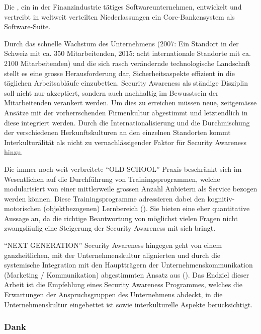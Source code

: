 \documentclass[../../main.tex]{subfiles}
\begin{document}
\begin{sloppypar}
Die \company, ein in der Finanzindustrie tätiges Softwareunternehmen, entwickelt und vertreibt in weltweit verteilten Niederlassungen ein Core-Bankensystem als Software-Suite.

Durch das schnelle Wachstum des Unternehmens (2007: Ein Standort in der Schweiz mit ca. 350 Mitarbeitenden, 2015: acht internationale Standorte mit ca. 2100 Mitarbeitenden) und die sich rasch verändernde technologische Landschaft stellt es eine grosse Herausforderung dar, Sicherheitsaspekte effizient in die täglichen Arbeitsabläufe einzubetten. Security Awareness als ständige Disziplin soll nicht nur akzeptiert, sondern auch nachhaltig im Bewusstsein der Mitarbeitenden verankert werden. Um dies zu erreichen müssen neue, zeitgemässe Ansätze mit der vorherrschenden Firmenkultur abgestimmt und letztendlich in diese integriert werden. Durch die Internationalisierung und die Durchmischung der  verschiedenen Herkunftskulturen an den einzelnen Standorten kommt Interkulturälität als nicht zu vernachlässigender Faktor für Security Awareness hinzu.

Die immer noch weit verbreitete "`OLD SCHOOL"' Praxis beschränkt sich im Wesentlichen auf die Durchführung von Trainingsprogrammen, welche modularisiert von einer mittlerweile grossen Anzahl Anbietern als Service bezogen werden können. Diese Trainingsprogramme adressieren dabei den kognitiv-motorischen (objektbezogenen) Lernbereich (\cite{helisch_security_2009}). Sie bieten eine eher quantitative Aussage an, da die richtige Beantwortung von möglichst vielen Fragen nicht zwangsläufig eine Steigerung der Security Awareness mit sich bringt.

"`NEXT GENERATION"' Security Awareness hingegen geht von einem ganzheitlichen, mit der Unternehmenskultur alignierten und durch die systemische Integration mit den Hauptträgern der Unternehmenskommunikation (Marketing / Kommunikation) abgestimmten Ansatz aus (\cite{helisch_security_2009}). Das Endziel dieser Arbeit ist die Empfehlung eines Security Awareness Programmes, welches die Erwartungen der Anspruchsgruppen des Unternehmens abdeckt, in die Unternehmenskultur eingebettet ist sowie interkulturelle Aspekte berücksichtigt.
\end{sloppypar}

\subsubsection*{Dank}

\blindtext
\end{document}
